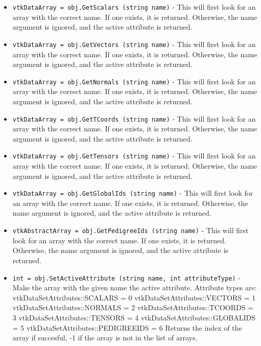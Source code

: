 \begin{itemize}
\item  \verb|vtkDataArray = obj.GetScalars (string name)| -  This will first look for an array with the correct name.
 If one exists, it is returned. Otherwise, the name argument
 is ignored, and the active attribute is returned.

\item  \verb|vtkDataArray = obj.GetVectors (string name)| -  This will first look for an array with the correct name.
 If one exists, it is returned. Otherwise, the name argument
 is ignored, and the active attribute is returned.

\item  \verb|vtkDataArray = obj.GetNormals (string name)| -  This will first look for an array with the correct name.
 If one exists, it is returned. Otherwise, the name argument
 is ignored, and the active attribute is returned.

\item  \verb|vtkDataArray = obj.GetTCoords (string name)| -  This will first look for an array with the correct name.
 If one exists, it is returned. Otherwise, the name argument
 is ignored, and the active attribute is returned.

\item  \verb|vtkDataArray = obj.GetTensors (string name)| -  This will first look for an array with the correct name.
 If one exists, it is returned. Otherwise, the name argument
 is ignored, and the active attribute is returned.

\item  \verb|vtkDataArray = obj.GetGlobalIds (string name)| -  This will first look for an array with the correct name.
 If one exists, it is returned. Otherwise, the name argument
 is ignored, and the active attribute is returned.

\item  \verb|vtkAbstractArray = obj.GetPedigreeIds (string name)| -  This will first look for an array with the correct name.
 If one exists, it is returned. Otherwise, the name argument
 is ignored, and the active attribute is returned.

\item  \verb|int = obj.SetActiveAttribute (string name, int attributeType)| -  Make the array with the given name the active attribute.
 Attribute types are:
  vtkDataSetAttributes::SCALARS = 0
  vtkDataSetAttributes::VECTORS = 1
  vtkDataSetAttributes::NORMALS = 2
  vtkDataSetAttributes::TCOORDS = 3
  vtkDataSetAttributes::TENSORS = 4
  vtkDataSetAttributes::GLOBALIDS = 5
  vtkDataSetAttributes::PEDIGREEIDS = 6
 Returns the index of the array if succesful, -1 if the array 
 is not in the list of arrays.


\end{itemize}
